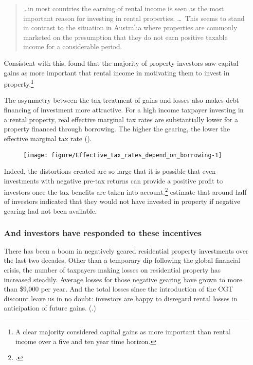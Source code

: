 \documentclass{grattan}\usepackage[]{graphicx}\usepackage[]{color}
\begin{document}
\begin{quote}
\!\dots in most countries the earning of rental income is seen as the most important reason for investing in rental properties. \dots\ This seems to stand in contrast to the situation in Australia where properties are commonly marketed on the presumption that they do not earn positive taxable income for a considerable period.
\end{quote}

Consistent with this, \textcite{seelig2009understanding} found that the majority of property investors saw capital gains as more important that rental income in motivating them to invest in property.\footnote{A clear majority considered capital gains as more important than rental income over a five and ten year time horizon.}

The asymmetry between the tax treatment of gains and losses also makes debt financing of investment more attractive. For a high income taxpayer investing in a rental property, real effective marginal tax rates are substantially lower for a property financed through borrowing. The higher the gearing, the lower the effective marginal tax rate (). 


\begin{figure}
\texttt{[image: figure/Effective\_tax\_rates\_depend\_on\_borrowing-1]}

\end{figure}
Indeed, the distortions created are so large that it is possible that even investments with negative pre-tax returns can provide a positive profit to investors once the tax benefits are taken into account.\footcite[p.~78]{Burman1999}  \textcite{seelig2009understanding} estimate that around half of investors indicated that they would not have invested in property if negative gearing had not been available.

\subsubsection{And investors have responded to these incentives}
There has been a boom in negatively geared residential property investments over the last two decades. Other than a temporary dip following the global financial crisis, the number of taxpayers making losses on residential property has increased steadily. Average losses for those negative gearing have grown to more than \$9,000 per year. And the total losses since the introduction of the CGT discount leave us in no doubt: investors are happy to disregard rental losses in anticipation of future gains. (.)
\end{document}
